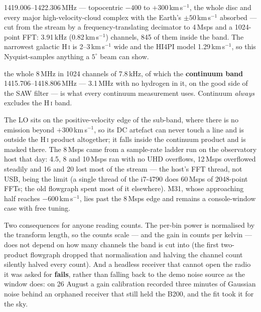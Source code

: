 \documentclass[11pt,a4paper]{article}
\begin{document}
\begin{description}[style=nextline]
    \item[H\,\textsc{i} sub-band] 1419.006--1422.306\,MHz --- topocentric $-400$ to $+300$\,km\,s$^{-1}$, the whole disc and every major high-velocity-cloud complex with the Earth's $\pm 50$\,km\,s$^{-1}$ absorbed --- cut from the stream by a frequency-translating decimator to 4\,Msps and a 1024-point FFT: 3.91\,kHz (0.82\,km\,s$^{-1}$) channels, 845 of them inside the band. The narrowest galactic H\,\textsc{i} is 2--3\,km\,s$^{-1}$ wide and the HI4PI model 1.29\,km\,s$^{-1}$, so this Nyquist-samples anything a $5^\circ$ beam can show.
    \item[Continuum product] the whole 8\,MHz in 1024 channels of 7.8\,kHz, of which the \textbf{continuum band} 1415.706--1418.806\,MHz --- 3.1\,MHz with no hydrogen in it, on the good side of the SAW filter --- is what every continuum measurement uses. Continuum \emph{always} excludes the H\,\textsc{i} band.
\end{description}

The LO sits on the positive-velocity edge of the sub-band, where there is no emission beyond $+300$\,km\,s$^{-1}$, so its DC artefact can never touch a line and is outside the H\,\textsc{i} product altogether; it falls inside the continuum product and is masked there. The 8\,Msps came from a sample-rate ladder run on the observatory host that day: 4.5, 8 and 10\,Msps ran with no UHD overflows, 12\,Msps overflowed steadily and 16 and 20 lost most of the stream --- the host's FFT thread, not USB, being the limit (a single thread of the i7-4790 does 60\,Msps of 2048-point FFTs; the old flowgraph spent most of it elsewhere). M31, whose approaching half reaches $-600$\,km\,s$^{-1}$, lies past the 8\,Msps edge and remains a console-window case with free tuning.

Two consequences for anyone reading counts. The per-bin power is normalised by the transform length, so the counts scale --- and the gain in counts per kelvin --- does not depend on how many channels the band is cut into (the first two-product flowgraph dropped that normalisation and halving the channel count silently halved every count). And a headless receiver that cannot open the radio it was asked for \textbf{fails}, rather than falling back to the demo noise source as the window does: on 26 August a gain calibration recorded three minutes of Gaussian noise behind an orphaned receiver that still held the B200, and the fit took it for the sky.
\end{document}
